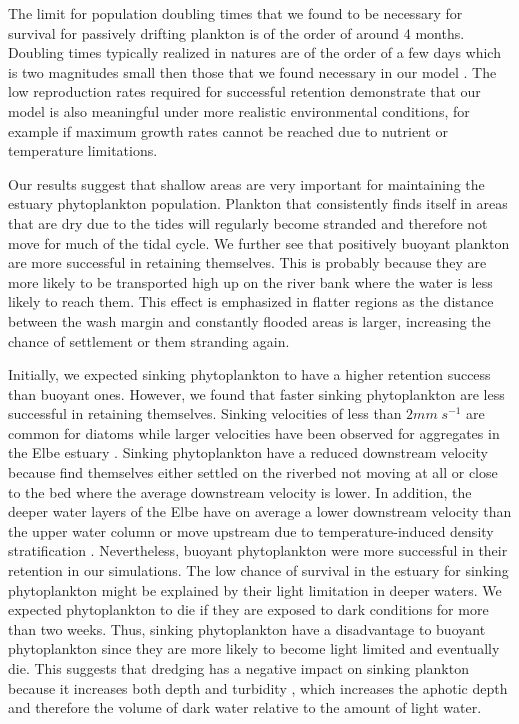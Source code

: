 \documentclass[npg, manuscript]{copernicus}
\begin{document}
The limit for population doubling times that we found to be necessary for survival for passively drifting plankton is of the order of around 4 months. Doubling times typically realized in natures are of the order of a few days which is two magnitudes small then those that we found necessary in our model \citep{Koch2004,Wirtz2011}.
The low reproduction rates required for successful retention demonstrate that our model is also meaningful under more realistic environmental conditions, for example if maximum growth rates cannot be reached due to nutrient or temperature limitations.

Our results suggest that shallow areas are very important for maintaining the estuary phytoplankton population.
Plankton that consistently finds itself in areas that are dry due to the tides will regularly become stranded and therefore not move for much of the tidal cycle.
We further see that positively buoyant plankton are more successful in retaining themselves. 
This is probably because they are more likely to be transported high up on the river bank where the water is less likely to reach them.
This effect is emphasized in flatter regions as the distance between the wash margin and constantly flooded areas is larger, increasing the chance of settlement or them stranding again.


Initially, we expected sinking phytoplankton to have a higher retention success than buoyant ones. 
However, we found that faster sinking phytoplankton are less successful in retaining themselves.
Sinking velocities of less than $2 \unit{mm\;s^{-1}}$ are common for diatoms \citep{Passow1991} while larger velocities have been observed for aggregates in the Elbe estuary \citep{Fennessy1996}.
Sinking phytoplankton have a reduced downstream velocity because find themselves either settled on the riverbed not moving at all or close to the bed where the average downstream velocity is lower.
In addition, the deeper water layers of the Elbe have on average a lower downstream velocity than the upper water column or move upstream  due to temperature-induced density stratification \citep{Pein2021}.
Nevertheless, buoyant phytoplankton were more successful in their retention in our simulations.
The low chance of survival in the estuary for sinking phytoplankton might be explained by their light limitation in deeper waters.
We expected phytoplankton to die if they are exposed to dark conditions for more than two weeks.
Thus, sinking phytoplankton have a disadvantage to buoyant phytoplankton since they are more likely to become light limited and eventually die.
This suggests that dredging has a negative impact on sinking plankton because it increases both depth and turbidity \citep{DeJonge2014}, which increases the aphotic depth and therefore the volume of dark water relative to the amount of light water.
\end{document}
